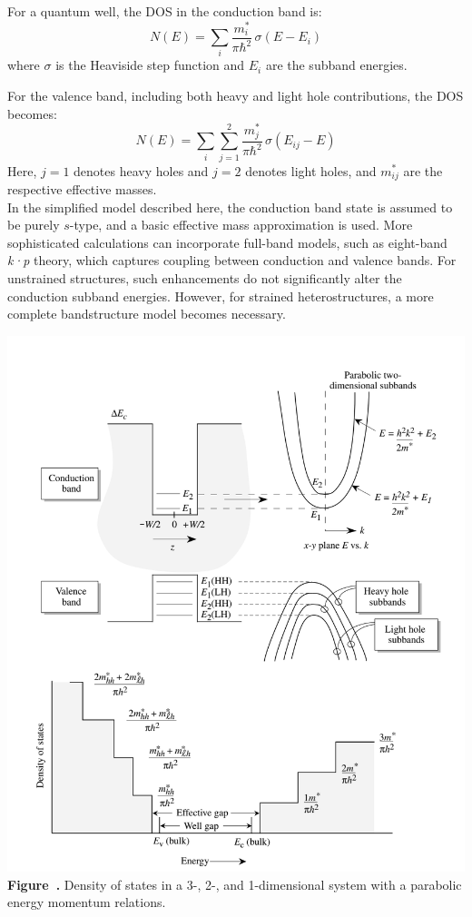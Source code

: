 For a quantum well, the DOS in the conduction band is:
\begin{equation}
	N(E) = \sum_i \frac{m_i^*}{\pi \hbar^2} \, \sigma(E - E_i)
\end{equation}
where \( \sigma \) is the Heaviside step function and \( E_i \) are the subband energies.

For the valence band, including both heavy and light hole contributions, the DOS becomes:
\begin{equation}
	N(E) = \sum_i \sum_{j=1}^{2} \frac{m_j^*}{\pi \hbar^2} \, \sigma(E_{ij} - E)
\end{equation}
Here, \( j = 1 \) denotes heavy holes and \( j = 2 \) denotes light holes, and \( m_{ij}^* \) are the respective effective masses.\\
In the simplified model described here, the conduction band state is assumed to be purely $s$-type, and a basic effective mass approximation is used. More sophisticated calculations can incorporate full-band models, such as eight-band \textit{k·p} theory, which captures coupling between conduction and valence bands. For unstrained structures, such enhancements do not significantly alter the conduction subband energies. However, for strained heterostructures, a more complete bandstructure model becomes necessary.

\begin{center}
	\begin{minipage}{0.8\textwidth}
		\centering
		\includegraphics[width=\textwidth]{img/DensityOfState.png}
		\\[0.5em]
		\textbf{Figure~\thefigure.} Density of states in a 3-, 2-, and 1-dimensional system with a parabolic energy momentum relations.
		\label{fig:DensityOfState}
	\end{minipage}
\end{center}


